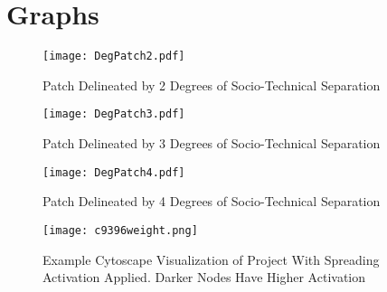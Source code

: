 \chapter{Graphs}
\label{app:cytoscape}

\begin{figure}[ht]
  \centering
  \texttt{[image: DegPatch2.pdf]}
  \caption{Patch Delineated by 2 Degrees of Socio-Technical Separation}
  \label{fig:degpatch2}
\end{figure}
\begin{figure}[ht]
  \centering
  \texttt{[image: DegPatch3.pdf]}
  \caption{Patch Delineated by 3 Degrees of Socio-Technical Separation}
  \label{fig:degpatch3}
\end{figure}
\begin{figure}[ht]
  \centering
  \texttt{[image: DegPatch4.pdf]}
  \caption{Patch Delineated by 4 Degrees of Socio-Technical Separation}
  \label{fig:degpatch4}
\end{figure}

\begin{figure}[ht]
	\centering
	\texttt{[image: c9396weight.png]}
	\caption{Example Cytoscape Visualization of Project With Spreading Activation Applied. Darker Nodes Have Higher Activation}
	\label{fig:c9396}
\end{figure}





